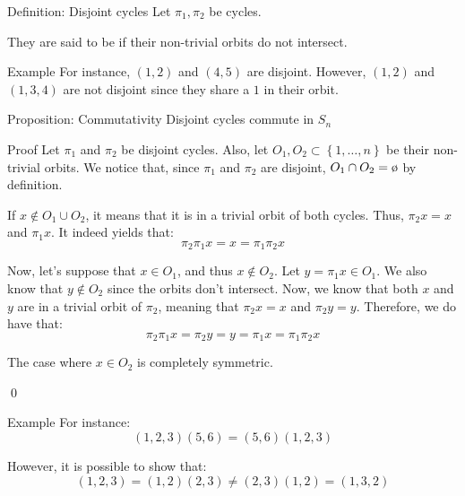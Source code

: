 \documentclass[a4paper]{article}
\begin{document}
\begin{parag}{Definition: Disjoint cycles}
    Let $\pi_1, \pi_2$ be cycles.

    They are said to be  if their non-trivial orbits do not intersect.

    \begin{subparag}{Example}
        For instance, $\left(1, 2\right)$ and $\left(4, 5\right)$ are disjoint. However, $\left(1, 2\right)$ and $\left(1, 3, 4\right)$ are not disjoint since they share a $1$ in their orbit.
    \end{subparag}
\end{parag}

\begin{parag}{Proposition: Commutativity}
    Disjoint cycles commute in $S_n$

    \begin{subparag}{Proof}
        Let $\pi_1$ and $\pi_2$ be disjoint cycles. Also, let $O_1, O_2 \subset \left\{1, \ldots, n\right\}$ be their non-trivial orbits. We notice that, since $\pi_1$ and $\pi_2$ are disjoint, $O_1 \cap O_2 = \o$ by definition.

        If $x \not\in O_1 \cup O_2$, it means that it is in a trivial orbit of both cycles. Thus, $\pi_2 x = x$ and $\pi_1 x$. It indeed yields that: 
        \[\pi_2 \pi_1 x = x = \pi_1 \pi_2 x\]
        
        Now, let's suppose that $x \in O_1$, and thus $x \not \in O_2$. Let $y = \pi_1 x \in O_1$. We also know that $y \not \in O_2$ since the orbits don't intersect. Now, we know that both $x$ and $y$ are in a trivial orbit of $\pi_2$, meaning that $\pi_2 x = x$ and $\pi_2 y = y$. Therefore, we do have that: 
        \[\pi_2 \pi_1 x = \pi_2 y = y = \pi_1 x = \pi_1 \pi_2 x\]

        The case where $x \in O_2$ is completely symmetric.

        \qed
    \end{subparag}

    \begin{subparag}{Example}
        For instance: 
        \[\left(1, 2, 3\right)\left(5, 6\right) = \left(5, 6\right)\left(1, 2, 3\right)\]
        
        However, it is possible to show that: 
        \[\left(1, 2, 3\right) = \left(1, 2\right)\left(2, 3\right) \neq \left(2, 3\right)\left(1, 2\right) = \left(1, 3, 2\right)\]
    \end{subparag}
\end{parag}
\end{document}
